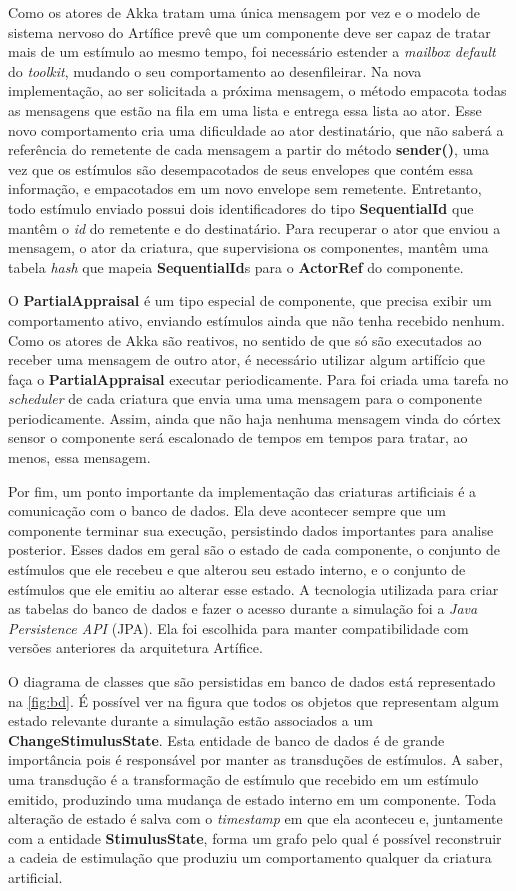 Como os atores de Akka tratam uma única mensagem por vez e o modelo de sistema nervoso do Artífice prevê que um componente deve ser capaz de tratar mais de um estímulo ao mesmo tempo, foi necessário estender a \textit{mailbox default} do \textit{toolkit}, mudando o seu comportamento ao desenfileirar. Na nova implementação, ao ser solicitada a próxima mensagem, o método empacota todas as mensagens que estão na fila em uma lista e entrega essa lista ao ator. Esse novo comportamento cria uma dificuldade ao ator destinatário, que não saberá a referência do remetente de cada mensagem a partir do método \textbf{sender()}, uma vez que os estímulos são desempacotados de seus envelopes que contém essa informação, e empacotados em um novo envelope sem remetente. Entretanto, todo estímulo enviado possui dois identificadores do tipo \textbf{SequentialId} que mantêm o \textit{id} do remetente e do destinatário. Para recuperar o ator que enviou a mensagem, o ator da criatura, que supervisiona os componentes, mantêm uma tabela \textit{hash} que mapeia \textbf{SequentialId}s para o \textbf{ActorRef} do componente.

O \textbf{PartialAppraisal} é um tipo especial de componente, que  precisa exibir um comportamento ativo, enviando estímulos ainda que não tenha recebido nenhum. Como os atores de Akka são reativos, no sentido de que só são executados ao receber uma mensagem de outro ator, é necessário utilizar algum artifício que faça o \textbf{PartialAppraisal} executar periodicamente. Para foi criada uma tarefa no \textit{scheduler} de cada criatura que envia uma uma mensagem para o componente periodicamente. Assim, ainda que não haja nenhuma mensagem vinda do córtex sensor o componente será escalonado de tempos em tempos para tratar, ao menos, essa mensagem. 

Por fim, um ponto importante da implementação das criaturas artificiais é a comunicação com o banco de dados. Ela deve acontecer sempre que um componente terminar sua execução, persistindo dados importantes para analise posterior. Esses dados em geral são o estado de cada componente, o conjunto de estímulos que ele recebeu e que alterou seu estado interno, e o conjunto de estímulos que ele emitiu ao alterar esse estado. A tecnologia utilizada para criar as tabelas do banco de dados e fazer o acesso durante a simulação foi a \textit{Java Persistence API} (JPA). Ela foi escolhida para manter compatibilidade com versões anteriores da arquitetura Artífice. 

O diagrama de classes que são persistidas em banco de dados está representado na \autoref{fig:bd}. É possível ver na figura que todos os objetos que representam algum estado relevante durante a simulação estão associados a um \textbf{ChangeStimulusState}. Esta entidade de banco de dados é de grande importância pois é responsável por manter as transduções de estímulos. A saber, uma transdução é a transformação de estímulo que recebido em um estímulo emitido, produzindo uma mudança de estado interno em um componente. Toda alteração de estado é salva com o \textit{timestamp} em que ela aconteceu e, juntamente com a entidade \textbf{StimulusState}, forma um grafo pelo qual é possível reconstruir a cadeia de estimulação que produziu um comportamento qualquer da criatura artificial. 

